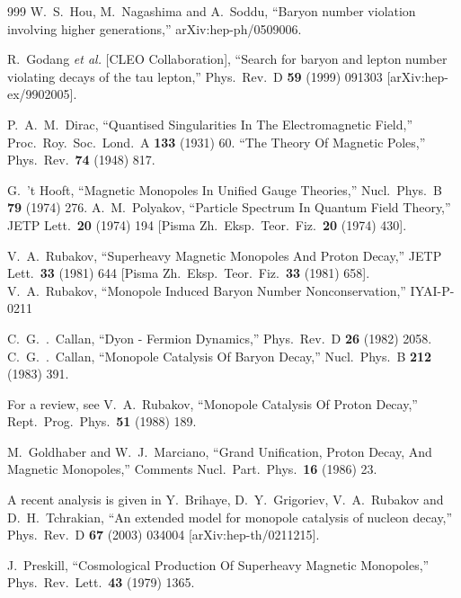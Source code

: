 \begin{thebibliography}{999}
  W.~S.~Hou, M.~Nagashima and A.~Soddu,
  ``Baryon number violation involving higher generations,''
  arXiv:hep-ph/0509006.

  R.~Godang {\it et al.}  [CLEO Collaboration],
 ``Search for baryon and lepton number violating decays of the tau lepton,''
  Phys.\ Rev.\ D {\bf 59} (1999) 091303
  [arXiv:hep-ex/9902005].

  P.~A.~M.~Dirac,
  ``Quantised Singularities In The Electromagnetic Field,''
  Proc.\ Roy.\ Soc.\ Lond.\ A {\bf 133} (1931) 60.
  ``The Theory Of Magnetic Poles,''
  Phys.\ Rev.\  {\bf 74} (1948) 817.

  G.~'t Hooft,
  ``Magnetic Monopoles In Unified Gauge Theories,''
  Nucl.\ Phys.\ B {\bf 79} (1974) 276.
  A.~M.~Polyakov,
  ``Particle Spectrum In Quantum Field Theory,''
  JETP Lett.\  {\bf 20} (1974) 194
  [Pisma Zh.\ Eksp.\ Teor.\ Fiz.\  {\bf 20} (1974) 430].

  V.~A.~Rubakov,
  ``Superheavy Magnetic Monopoles And Proton Decay,''
  JETP Lett.\  {\bf 33} (1981) 644
  [Pisma Zh.\ Eksp.\ Teor.\ Fiz.\  {\bf 33} (1981) 658].
  V.~A.~Rubakov,
  ``Monopole Induced Baryon Number Nonconservation,''
IYAI-P-0211

  C.~G.~.~Callan,
  ``Dyon - Fermion Dynamics,''
  Phys.\ Rev.\ D {\bf 26} (1982) 2058.
  C.~G.~.~Callan,
  ``Monopole Catalysis Of Baryon Decay,''
  Nucl.\ Phys.\ B {\bf 212} (1983) 391.

For a review, see 
  V.~A.~Rubakov,
  ``Monopole Catalysis Of Proton Decay,''
  Rept.\ Prog.\ Phys.\  {\bf 51} (1988) 189.

  M.~Goldhaber and W.~J.~Marciano,
  ``Grand Unification, Proton Decay, And Magnetic Monopoles,''
  Comments Nucl.\ Part.\ Phys.\  {\bf 16} (1986) 23.

 A recent analysis is given in 
  Y.~Brihaye, D.~Y.~Grigoriev, V.~A.~Rubakov and D.~H.~Tchrakian,
  ``An extended model for monopole catalysis of nucleon decay,''
  Phys.\ Rev.\ D {\bf 67} (2003) 034004
  [arXiv:hep-th/0211215].

  J.~Preskill,
  ``Cosmological Production Of Superheavy Magnetic Monopoles,''
  Phys.\ Rev.\ Lett.\  {\bf 43} (1979) 1365.


\end{thebibliography}

